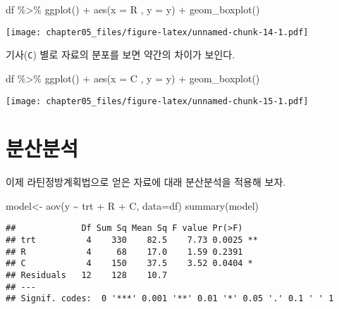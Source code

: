 \documentclass[
]{book}
\newenvironment{Shaded}{\begin{snugshade}}{\end{snugshade}}
\newcommand{\AttributeTok}[1]{\textcolor[rgb]{0.77,0.63,0.00}{#1}}
\newcommand{\FunctionTok}[1]{\textcolor[rgb]{0.00,0.00,0.00}{#1}}
\newcommand{\NormalTok}[1]{#1}
\newcommand{\OtherTok}[1]{\textcolor[rgb]{0.56,0.35,0.01}{#1}}
\newcommand{\SpecialCharTok}[1]{\textcolor[rgb]{0.00,0.00,0.00}{#1}}
\begin{document}
\begin{Shaded}
\begin{Highlighting}[]
\NormalTok{df }\SpecialCharTok{\%\textgreater{}\%} 
  \FunctionTok{ggplot}\NormalTok{() }\SpecialCharTok{+}
  \FunctionTok{aes}\NormalTok{(}\AttributeTok{x =}\NormalTok{ R , }\AttributeTok{y =}\NormalTok{ y) }\SpecialCharTok{+}
  \FunctionTok{geom\_boxplot}\NormalTok{() }
\end{Highlighting}
\end{Shaded}

\texttt{[image: chapter05\_files/figure-latex/unnamed-chunk-14-1.pdf]}

기사(\texttt{C}) 별로 자료의 분포를 보면 약간의 차이가 보인다.

\begin{Shaded}
\begin{Highlighting}[]
\NormalTok{df }\SpecialCharTok{\%\textgreater{}\%} 
  \FunctionTok{ggplot}\NormalTok{() }\SpecialCharTok{+}
  \FunctionTok{aes}\NormalTok{(}\AttributeTok{x =}\NormalTok{ C , }\AttributeTok{y =}\NormalTok{ y) }\SpecialCharTok{+}
  \FunctionTok{geom\_boxplot}\NormalTok{() }
\end{Highlighting}
\end{Shaded}

\texttt{[image: chapter05\_files/figure-latex/unnamed-chunk-15-1.pdf]}

\hypertarget{uxbd84uxc0b0uxbd84uxc11d-1}{%
\section{분산분석}\label{uxbd84uxc0b0uxbd84uxc11d-1}}

이제 라틴정방계획법으로 얻은 자료에 대래 분산분석을 적용해 보자.

\begin{Shaded}
\begin{Highlighting}[]
\NormalTok{model}\OtherTok{\textless{}{-}} \FunctionTok{aov}\NormalTok{(y }\SpecialCharTok{\textasciitilde{}}\NormalTok{ trt }\SpecialCharTok{+}\NormalTok{ R }\SpecialCharTok{+}\NormalTok{ C, }\AttributeTok{data=}\NormalTok{df)}
\FunctionTok{summary}\NormalTok{(model)}
\end{Highlighting}
\end{Shaded}

\begin{verbatim}
##             Df Sum Sq Mean Sq F value Pr(>F)   
## trt          4    330    82.5    7.73 0.0025 **
## R            4     68    17.0    1.59 0.2391   
## C            4    150    37.5    3.52 0.0404 * 
## Residuals   12    128    10.7                  
## ---
## Signif. codes:  0 '***' 0.001 '**' 0.01 '*' 0.05 '.' 0.1 ' ' 1
\end{verbatim}
\end{document}
